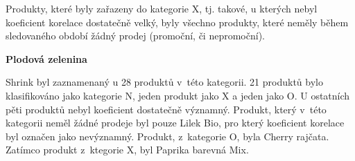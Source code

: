 Produkty, které byly zařazeny do kategorie X, tj. takové, u kterých nebyl koeficient korelace dostatečně velký, byly všechno produkty, které neměly během sledovaného období žádný prodej (promoční, či nepromoční).




\textbf{Plodová zelenina}

Shrink byl zaznamenaný u 28 produktů v~této kategorii. 21 produktů bylo klasifikováno jako kategorie N, jeden produkt jako X a jeden jako O. U ostatních pěti produktů nebyl koeficient dostatečně významný. Produkt, který v~této kategorii neměl žádné prodeje byl pouze Lilek Bio, pro který koeficient korelace byl označen jako nevýznamný. Produkt, z~kategorie O, byla Cherry rajčata. Zatímco produkt z~ktegorie X, byl Paprika barevná Mix.


